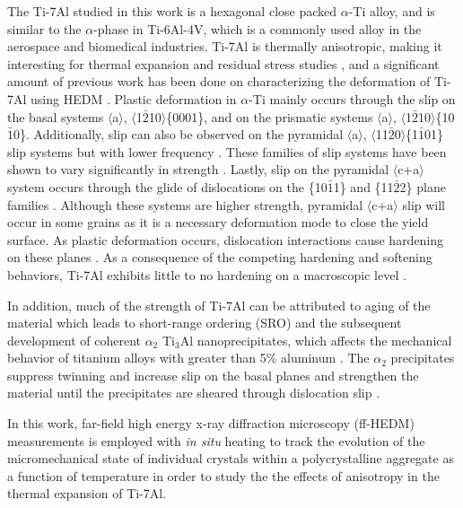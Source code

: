\documentclass[3p]{elsarticle}
\begin{document}
	The Ti-7Al studied in this work is a hexagonal close packed $\alpha$-Ti alloy, and is similar to the $\alpha$-phase in Ti-6Al-4V, which is a commonly used alloy in the aerospace and biomedical industries. Ti-7Al  is thermally anisotropic, making it interesting for thermal expansion and residual stress studies \cite{Spreadborough1959, Pawar1968, Russell1997}, and a significant amount of previous work has been done on characterizing the deformation of Ti-7Al using HEDM \cite{Lienert2009,Schuren2015,Chatterjee2016,Turner2017,Pagan2017,Pagan2018,Nygren2019,Nygren2020}. Plastic deformation in $\alpha$-Ti mainly occurs through the slip on the basal systems $\langle$a$\rangle$, $\langle$1$\bar{2}$10$\rangle$\{0001\}, and on the prismatic systems $\langle$a$\rangle$, $\langle$1$\bar{2}$10$\rangle$\{10$\bar{1}$0\}. Additionally, slip can also be observed on the pyramidal $\langle$a$\rangle$, $\langle$11$\bar{2}$0$\rangle$\{1$\bar{1}$01\} slip systems but with lower frequency \cite{Lutjering2007,Lienert2009,Pagan2017,Tan1998,Williams2002}. These families of slip systems have been shown to vary significantly in strength \cite{Lutjering2007,Pagan2017}. Lastly, slip on the pyramidal $\langle$c+a$\rangle$ system occurs through the glide of dislocations on the \{10$\bar{1}$1\} and \{11$\bar{2}$2\} plane families \cite{Williams1968}. Although these systems are higher strength, pyramidal $\langle$c+a$\rangle$ slip will occur in some grains as it is a necessary deformation mode to close the yield surface. As plastic deformation occurs, dislocation interactions cause hardening on these planes \cite{Pagan2017}. As a consequence of the competing hardening and softening behaviors, Ti-7Al exhibits little to no hardening on a macroscopic level \cite{Pagan2017}. 
	
	In addition, much of the strength of Ti-7Al can be attributed to aging of the material which leads to short-range ordering (SRO) and the subsequent development of coherent $\alpha$$_2$ Ti$_3$Al nanoprecipitates, which af{}fects the mechanical behavior of titanium alloys with greater than 5\% aluminum \cite{VandeWalle2002,Venkataraman2017,Gardner2020}. The $\alpha$$_2$ precipitates suppress twinning and increase slip on the basal planes \cite{Fitzner2016,Neeraj2001} and strengthen the material until the precipitates are sheared through dislocation slip \cite{Pagan2017}.
	
	In this work, far-field high energy x-ray dif{}fraction microscopy (f{}f-HEDM) measurements is employed with \textit{in situ} heating to track the evolution of the micromechanical state of individual crystals within a polycrystalline aggregate as a function of temperature in order to study the the ef{}fects of anisotropy in the thermal expansion of Ti-7Al.
\end{document}
